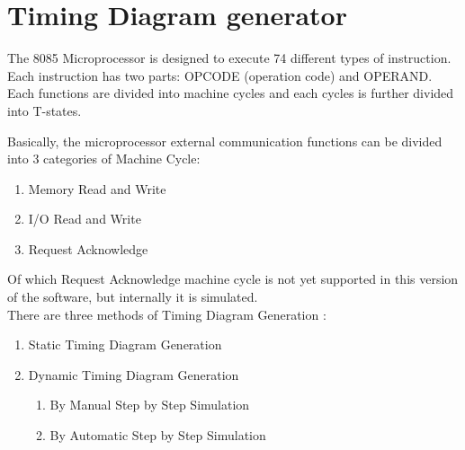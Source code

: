 \chapter{Timing Diagram generator}
The 8085 Microprocessor is designed to execute 74 different types of instruction. Each instruction has two parts: OPCODE (operation code) and OPERAND. Each functions are divided into machine cycles and each cycles is further divided into T-states.

Basically, the microprocessor external communication functions can be divided into 3 categories of Machine Cycle:
\begin{enumerate}
\item Memory Read and Write
\item I/O Read and Write
\item Request Acknowledge
\end{enumerate}

Of which Request Acknowledge machine cycle is not yet supported in this version of the software, but internally it is simulated.
\\
There are three methods of Timing Diagram Generation :
\begin{enumerate}
\item Static Timing Diagram Generation
\item Dynamic Timing Diagram Generation
\begin{enumerate}
\item By Manual Step by Step Simulation
\item By Automatic Step by Step Simulation
\end{enumerate}
\end{enumerate}
\pagebreak
